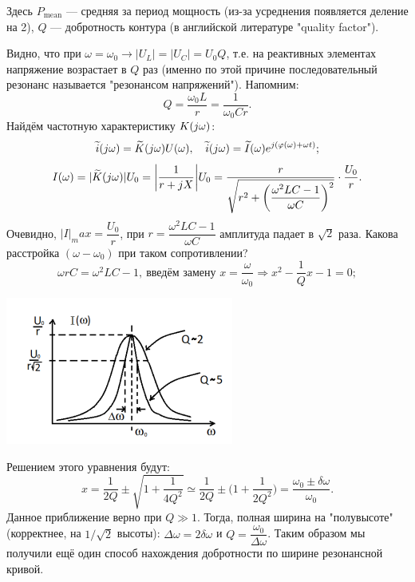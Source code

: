 \documentclass[../main/main.tex]{subfiles}
\begin{document}
Здесь $P_{\text{mean}}$ --- средняя за период мощность (из-за усреднения появляется деление на 2), $Q$ --- добротность контура (в английской литературе "quality factor").

Видно, что при $\omega = \omega_0 \rightarrow |U_L| = |U_C| = U_0 Q$, т.е. на реактивных элементах напряжение возрастает в $Q$ раз (именно по этой причине последовательный резонанс называется "резонансом напряжений"). Напомним: 
$$Q = \dfrac{\omega_0 L}{r} = \dfrac{1}{\omega_0 Cr}.$$
Найдём частотную характеристику $K(j\omega)$:
$$\widetilde{i}(j\omega) = \widetilde{K}(j\omega) U(\omega), \quad \widetilde{i}(j\omega) = \widetilde{I}(\omega) e^{j(\varphi(\omega) + \omega t)};$$
$$I(\omega) = |\widetilde{K}(j\omega)| U_0 = \bigg| \dfrac{1}{r + jX}\bigg| U_0 = \dfrac{r}{\sqrt{r^2 + \bigg(\dfrac{\omega^2 LC - 1}{\omega C} \bigg)^2}} \cdot \dfrac{U_0}{r}.$$
Очевидно, $|I|_max = \dfrac{U_0}{r}$, при $r = \dfrac{\omega^2 LC - 1}{\omega C}$ амплитуда падает в $\sqrt{2}$ раза. Какова расстройка $(\omega - \omega_0)$ при таком сопротивлении?
$$\omega rC = \omega^2 LC - 1,~\text{введём замену } x = \dfrac{\omega}{\omega_0} \Rightarrow x^2 - \dfrac{1}{Q} x - 1 = 0;$$

\begin{minipage}{6cm}
\centering
\includegraphics[scale=0.7]{../section01/images/I_o_RLC_lin/I_o_RLC_lin.png} %
\end{minipage} \hfill   
\begin{minipage}{10cm}
Решением этого уравнения будут:
$$x = \dfrac{1}{2Q} \pm \sqrt{1 + \dfrac{1}{4 Q^2}} \simeq  \dfrac{1}{2Q} \pm \bigg( 1 + \dfrac{1}{2 Q^2}\bigg) = \dfrac{\omega_0 \pm \delta \omega}{\omega_0}.$$
Данное приближение верно при $Q \gg 1$. Тогда, полная ширина на "полувысоте"{} (корректнее, на $1/\sqrt{2}$ высоты): $\Delta \omega = 2\delta \omega$ и $Q = \dfrac{\omega_0}{\Delta \omega}$. Таким образом мы получили ещё один способ нахождения добротности по ширине резонансной кривой.
\end{minipage}
\end{document}
